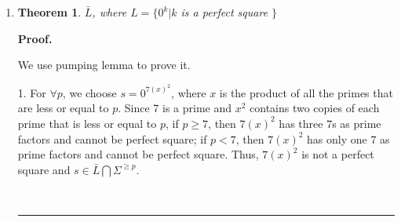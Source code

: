\documentclass{article}%
\newtheorem{theorem}{Theorem}
\newenvironment{proof}[1][Proof]{\textbf{#1.} }{\ \rule{0.5em}{0.5em}}
\begin{document}
\begin{enumerate}
\begin{enumerate}
\begin{proof}
\begin{itemize}
	For $v = a , y = a$, we choose $i = 2$. In this way, the number of $a$ would be $p+m+n$. By (2), $m+n \geq 1 \Rightarrow (p+m+n)^2 \neq p^2$. Thus $s = uv^2xy^2z = a^{p+m+n}b^{p^2} \notin L$. \\
	
  For $v = b , y = b$, we choose $i = 2$. In this way, the number of $b$ would be $p^2+m+n$. By (2), $m+n \geq 1 \Rightarrow p^2+m+n \neq p^2$. Thus $s = uv^2xy^2z = a^{p}b^{p^2+m+n} \notin L$. \\
		
	
	\item Case 2: Both $v$ and $y$ contain one number but they are different and $m \geq 1, n \geq 1$: \\
	
	$\frac{v}{y} | \frac{a^m}{b^n}$\\
	
	For $v = a , y = b$, we choose $i = 2$. In this way, the number of $a$ would be $p + m$ and the number of $b$ would be $p^2 + n$. Since $(p + m)^2 = p^2 + 2mp + m^2 > p^2 + n$. Thus $s = uv^2xy^2z = a^{p+m}b^{p^2+n} \notin L$. \\
	
	\item Case 3: Either $v$ or $y$ contain two numbers and $m \geq 1, n \geq 1, k \geq 1$: \\
	 
	$\frac{v}{y} | \frac{a^mb^k}{b^n}| \frac{a^m}{a^nb^k}$\\
	
	When $i = 2$, $s$ will have interleaving patterns, such as $a^mb^ka^mb^k$ and $a^nb^ka^nb^k$. Thus $s = uv^2xy^2z \notin L$.
	\end{itemize}
	
	\end{proof}
	
		\item 
	\begin{theorem}
$ {\bar L}$, where $L = \{ 0^k |k$  is a perfect square $\}$
	\end{theorem}
	\begin{proof}
	
	We use pumping lemma to prove it.
	
  1. For $\forall p$, we choose $s = 0^{7(x)^2}  $, where $x$ is the product of all the primes that are less or equal to $p$. Since 7 is a prime and $x^2$ contains two copies of each prime that is less or equal to $p$, if $p \geq 7$, then $7(x)^2$ has three $7$s as prime factors and cannot be perfect square; if $p < 7$, then $7(x)^2$ has only one $7$ as prime factors and cannot be perfect square. Thus, $7(x)^2$ is not a perfect square and $s \in \bar{L} \bigcap \Sigma ^{\geq p}$.
  

\end{proof}
\end{enumerate}
\end{enumerate}
\end{document}
